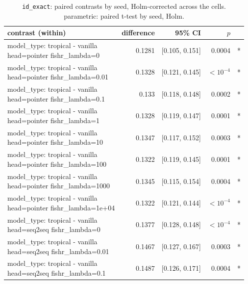 \documentclass[10pt]{article}
\makeatletter
\newcommand{\stackcell}[1]{\begin{tabular}[t]{@{}l@{}}#1\end{tabular}}
\makeatother
\begin{document}
{\small
\begin{longtable}{lrrrl}
\caption{\texttt{id\_exact}: paired contrasts by seed, Holm-corrected across the cells. parametric: paired t-test by seed, Holm.}\label{tab:paired-id_exact}\\
\toprule
contrast (within) & difference & 95\% CI & $p$ & \\
\midrule
\endhead
\stackcell{model\_type: tropical - vanilla\\\footnotesize head=pointer fishr\_lambda=0 } & 0.1281 & [0.105, 0.151] & 0.0004 & *\\
\stackcell{model\_type: tropical - vanilla\\\footnotesize head=pointer fishr\_lambda=0.01 } & 0.1328 & [0.121, 0.145] & $<10^{-4}$ & *\\
\stackcell{model\_type: tropical - vanilla\\\footnotesize head=pointer fishr\_lambda=0.1 } & 0.133 & [0.118, 0.148] & 0.0002 & *\\
\stackcell{model\_type: tropical - vanilla\\\footnotesize head=pointer fishr\_lambda=1 } & 0.1328 & [0.119, 0.147] & 0.0001 & *\\
\stackcell{model\_type: tropical - vanilla\\\footnotesize head=pointer fishr\_lambda=10 } & 0.1347 & [0.117, 0.152] & 0.0003 & *\\
\stackcell{model\_type: tropical - vanilla\\\footnotesize head=pointer fishr\_lambda=100 } & 0.1322 & [0.119, 0.145] & 0.0001 & *\\
\stackcell{model\_type: tropical - vanilla\\\footnotesize head=pointer fishr\_lambda=1000 } & 0.1345 & [0.115, 0.154] & 0.0004 & *\\
\stackcell{model\_type: tropical - vanilla\\\footnotesize head=pointer fishr\_lambda=1e+04 } & 0.1322 & [0.121, 0.144] & $<10^{-4}$ & *\\
\stackcell{model\_type: tropical - vanilla\\\footnotesize head=seq2seq fishr\_lambda=0 } & 0.1377 & [0.128, 0.148] & $<10^{-4}$ & *\\
\stackcell{model\_type: tropical - vanilla\\\footnotesize head=seq2seq fishr\_lambda=0.01 } & 0.1467 & [0.127, 0.167] & 0.0003 & *\\
\stackcell{model\_type: tropical - vanilla\\\footnotesize head=seq2seq fishr\_lambda=0.1 } & 0.1487 & [0.126, 0.171] & 0.0004 & *\\

\end{longtable}}
\end{document}
